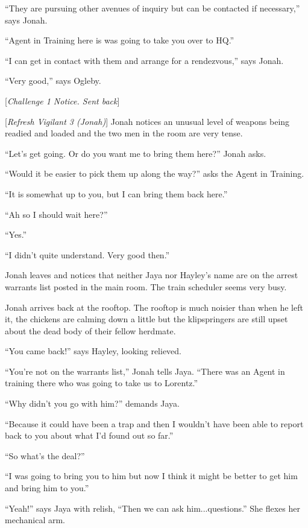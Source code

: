 ``They are pursuing other avenues of inquiry but can be contacted if necessary,'' says Jonah.

``Agent in Training here is was going to take you over to HQ.''

``I can get in contact with them and arrange for a rendezvous,'' says Jonah.

``Very good,'' says Ogleby.

{[}\textit{Challenge 1 Notice. Sent back}{]}

{[}\textit{Refresh Vigilant 3 (Jonah)}{]}  Jonah notices an unusual level of weapons being readied and loaded and the two men in the room are very tense. 

``Let's get going.  Or do you want me to bring them here?'' Jonah asks.

``Would it be easier to pick them up along the way?'' asks the Agent in Training.

``It is somewhat up to you, but I can bring them back here.''

``Ah so I should wait here?''

``Yes.''

``I didn't quite understand.  Very good then.''

Jonah leaves and notices that neither Jaya nor Hayley's name are on the arrest warrants list posted in the main room.  The train scheduler seems very busy.



Jonah arrives back at the rooftop.  The rooftop is much noisier than when he left it, the chickens are calming down a little but the klipspringers are still upset about the dead body of their fellow herdmate.

``You came back!'' says Hayley, looking relieved.

``You're not on the warrants list,'' Jonah tells Jaya.  ``There was an Agent in training there who was going to take us to Lorentz.''

``Why didn't you go with him?'' demands Jaya.

``Because it could have been a trap and then I wouldn't have been able to report back to you about what I'd found out so far.''

``So what's the deal?''

``I was going to bring you to him but now I think it might be better to get him and bring him to you.''

``Yeah!'' says Jaya with relish, ``Then we can ask him...questions.''  She flexes her mechanical arm.

